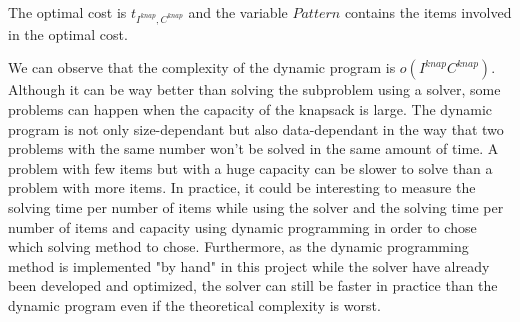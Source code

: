 \noindent The optimal cost is $t_{I^{knap}, C^{knap}}$ and the variable $Pattern$ contains the items involved in the optimal cost.

We can observe that the complexity of the dynamic program is $o(I^{knap}C^{knap})$. Although it can be way better than solving the subproblem using a solver, some problems can happen when the capacity of the knapsack is large. The dynamic program is not only size-dependant but also data-dependant in the way that two problems with the same number won't be solved in the same amount of time. A problem with few items but with a huge capacity can be slower to solve than a problem with more items. In practice, it could be interesting to measure the solving time per number of items while using the solver and the solving time per number of items and capacity using dynamic programming in order to chose which solving method to chose. Furthermore, as the dynamic programming method is implemented "by hand" in this project while the solver have already been developed and optimized, the solver can still be faster in practice than the dynamic program even if the theoretical complexity is worst.